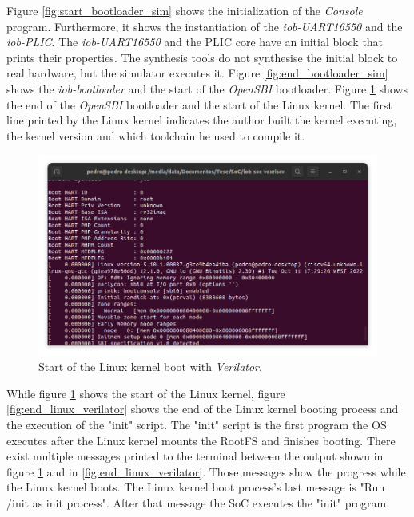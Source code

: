 Figure \ref{fig:start_bootloader_sim} shows the initialization of the \textit{Console} program. Furthermore, it shows the instantiation of the \textit{iob-UART16550} and the \textit{iob-PLIC}. The \textit{iob-UART16550} and the PLIC core have an initial block that prints their properties. The synthesis tools do not synthesise the initial block to real hardware, but the simulator executes it. Figure \ref{fig:end_bootloader_sim} shows the \textit{iob-bootloader} and the start of the \textit{OpenSBI} bootloader. Figure \ref{fig:start_linux_sim} shows the end of the \textit{OpenSBI} bootloader and the start of the Linux kernel. The first line printed by the Linux kernel indicates the author built the kernel executing, the kernel version and which toolchain he used to compile it.

\begin{figure}[!ht]
    \centering
    \includegraphics[width=\linewidth]{../images/start_Linux_sim.png}
    \caption{Start of the Linux kernel boot with \textit{Verilator}.}
    \label{fig:start_linux_sim}
\end{figure}

While figure \ref{fig:start_linux_sim} shows the start of the Linux kernel, figure \ref{fig:end_linux_verilator} shows the end of the Linux kernel booting process and the execution of the "init" script. The "init" script is the first program the OS executes after the Linux kernel mounts the RootFS and finishes booting. There exist multiple messages printed to the terminal between the output shown in figure \ref{fig:start_linux_sim} and in \ref{fig:end_linux_verilator}. Those messages show the progress while the Linux kernel boots. The Linux kernel boot process's last message is "Run /init as init process". After that message the SoC executes the "init" program.

